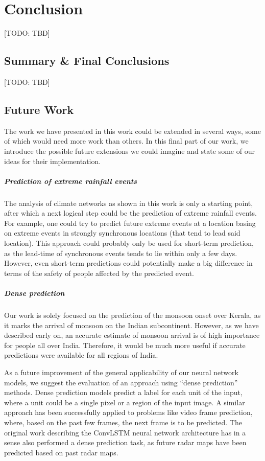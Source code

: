 \chapter{Conclusion}
\label{c:conclusion}
[TODO: TBD]

\section{Summary \& Final Conclusions}
[TODO: TBD]

\section{Future Work}
The work we have presented in this work could be extended in several ways, some of which would need more work than others. In this final part of our work, we introduce the possible future extensions we could imagine and state some of our ideas for their implementation.

\paragraph{Prediction of extreme rainfall events}
The analysis of climate networks as shown in this work is only a starting point, after which a next logical step could be the prediction of extreme rainfall events. For example, one could try to predict future extreme events at a location basing on extreme events in strongly synchronous locations (that tend to lead said location).  This approach could probably only be used for short-term prediction, as the lead-time of synchronous events tends to lie within only a few days. However, even short-term predictions could potentially make a big difference in terms of the safety of people affected by the predicted event.

\paragraph{Dense prediction}
Our work is solely focused on the prediction of the monsoon onset over Kerala, as it marks the arrival of monsoon on the Indian subcontinent. However, as we have described early on, an accurate estimate of monsoon arrival is of high importance for people all over India. Therefore, it would be much more useful if accurate predictions were available for all regions of India.

As a future improvement of the general applicability of our neural network models, we suggest the evaluation of an approach using ``dense prediction'' methods. Dense prediction models predict a label for each unit of the input, where a unit could be a single pixel or a region of the input image. A similar approach has been successfully applied to problems like video frame prediction, where, based on the past few frames, the next frame is to be predicted. The original work describing the ConvLSTM neural network architecture has in a sense also performed a dense prediction task, as future radar maps have been predicted based on past radar maps.


